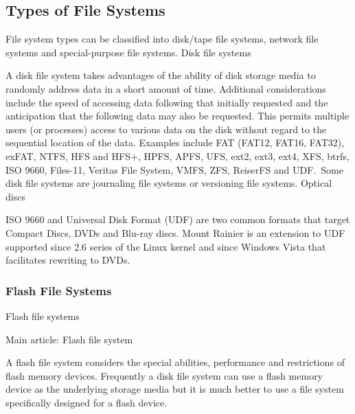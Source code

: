 \subsection{Types of File Systems}
\label{ssec:types_of_file_systems}

File system types can be classified into disk/tape file systems, network file
systems and special-purpose file systems.  Disk file systems



A disk file system takes advantages of the ability of disk storage media to
randomly address data in a short amount of time. Additional considerations
include the speed of accessing data following that initially requested and the
anticipation that the following data may also be requested. This permits
multiple users (or processes) access to various data on the disk without regard
to the sequential location of the data. Examples include FAT (FAT12, FAT16,
FAT32), exFAT, NTFS, HFS and HFS+, HPFS, APFS, UFS, ext2, ext3, ext4, XFS,
btrfs, ISO 9660, Files-11, Veritas File System, VMFS, ZFS, ReiserFS and UDF.\
Some disk file systems are journaling file systems or versioning file systems.
Optical discs



ISO 9660 and Universal Disk Format (UDF) are two common formats that target
Compact Discs, DVDs and Blu-ray discs. Mount Rainier is an extension to UDF
supported since 2.6 series of the Linux kernel and since Windows Vista that
facilitates rewriting to DVDs.



\subsubsection{Flash File Systems}
\label{sssec:flash_file_systems}


Flash file systems




Main article: Flash file system



A flash file system considers the special abilities, performance and restrictions of flash memory devices. Frequently a disk file system can use a flash memory device as the underlying storage media but it is much better to use a file system specifically designed for a flash device.




\subsubsectionend

